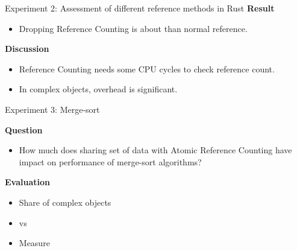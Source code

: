 \documentclass[9pt]{beamer}
\begin{document}
\begin{frame}[fragile]{Experiment 2: Assessment of different reference methods in Rust}
    \textbf{Result}
    \begin{itemize}
        \item Dropping Reference Counting is about  than normal reference.
    \end{itemize}

    \vspace{0.5cm}

    \textbf{Discussion}
    \begin{itemize}
        \item Reference Counting needs some CPU cycles to check reference count.
        \item In complex objects, overhead is significant.
    \end{itemize}
\end{frame}


\begin{frame}[fragile]{Experiment 3: Merge-sort}

    \textbf{Question}
    \begin{itemize}
        \item How much does sharing set of data with Atomic Reference Counting have impact on performance of merge-sort algorithms?
    \end{itemize}

    \vspace{0.5cm}

    \textbf{Evaluation}
    \begin{itemize}
        \item Share  of complex objects
        \item {} vs 
        \item Measure 
    \end{itemize}
\end{frame}

\end{document}
